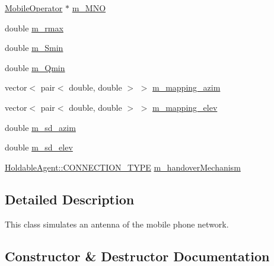 \begin{DoxyCompactItemize}
\item 
\hyperlink{class_mobile_operator}{Mobile\+Operator} $\ast$ \hyperlink{class_antenna_a775a081edfeefcf293bf3ffb3c19013e}{m\+\_\+\+M\+NO}
\item 
double \hyperlink{class_antenna_a7b8fda5c94e7cf03c14a0fe5447e5d46}{m\+\_\+rmax}
\item 
double \hyperlink{class_antenna_a55c98e1d697184199f908f88ae364886}{m\+\_\+\+Smin}
\item 
double \hyperlink{class_antenna_a8f58c6af021dc13d6d76d390daaf59d7}{m\+\_\+\+Qmin}
\item 
vector$<$ pair$<$ double, double $>$ $>$ \hyperlink{class_antenna_a0d4e25b246a30e3e6fdb303bed85e7da}{m\+\_\+mapping\+\_\+azim}
\item 
vector$<$ pair$<$ double, double $>$ $>$ \hyperlink{class_antenna_a71b55ca74697d064e231829343209fec}{m\+\_\+mapping\+\_\+elev}
\item 
double \hyperlink{class_antenna_af9ed0b78826b52bd60c497eb7f87be3d}{m\+\_\+sd\+\_\+azim}
\item 
double \hyperlink{class_antenna_aeb2ce4a95682b9ecff1395dfa857c089}{m\+\_\+sd\+\_\+elev}
\item 
\hyperlink{class_holdable_agent_ae2c334b004d7b9c5a999cf2618e4e518}{Holdable\+Agent\+::\+C\+O\+N\+N\+E\+C\+T\+I\+O\+N\+\_\+\+T\+Y\+PE} \hyperlink{class_antenna_a4fa1f72704f7a10fa54498b839c76833}{m\+\_\+handover\+Mechanism}
\end{DoxyCompactItemize}


\subsection{Detailed Description}
This class simulates an antenna of the mobile phone network. 

\subsection{Constructor \& Destructor Documentation}
\mbox{\label{class_antenna_a45fd110296e26b4cc646a7dc37de16c8}} 
